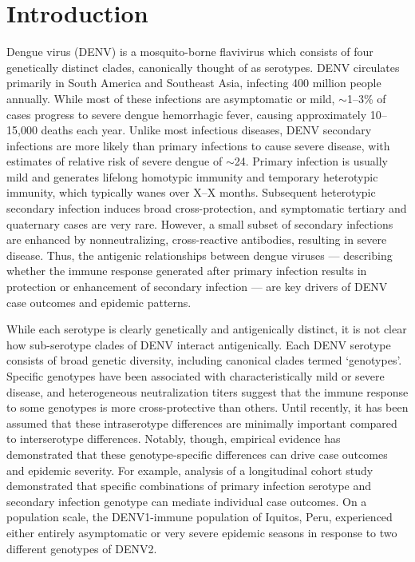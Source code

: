 \documentclass[11pt,oneside,letterpaper]{article}
\begin{document}
\section*{Introduction}
Dengue virus (DENV) is a mosquito-borne flavivirus which consists of four genetically distinct clades, canonically thought of as serotypes.
DENV circulates primarily in South America and Southeast Asia, infecting 400 million people annually.
While most of these infections are asymptomatic or mild, $\sim$1--3\% of cases progress to severe dengue hemorrhagic fever, causing approximately 10--15,000 deaths each year.
Unlike most infectious diseases, DENV secondary infections are more likely than primary infections to cause severe disease, with estimates of relative risk of severe dengue of $\sim$24.
Primary infection is usually mild and generates lifelong homotypic immunity and temporary heterotypic immunity, which typically wanes over X--X months.
Subsequent heterotypic secondary infection induces broad cross-protection, and symptomatic tertiary and quaternary cases are very rare.
However, a small subset of secondary infections are enhanced by nonneutralizing, cross-reactive antibodies, resulting in severe disease.
Thus, the antigenic relationships between dengue viruses --- describing whether the immune response generated after primary infection results in protection or enhancement of secondary infection --- are key drivers of DENV case outcomes and epidemic patterns.

While each serotype is clearly genetically and antigenically distinct, it is not clear how sub-serotype clades of DENV interact antigenically.
Each DENV serotype consists of broad genetic diversity, including canonical clades termed `genotypes'.
Specific genotypes have been associated with characteristically mild or severe disease, and heterogeneous neutralization titers suggest that the immune response to some genotypes is more cross-protective than others.
Until recently, it has been assumed that these intraserotype differences are minimally important compared to interserotype differences.
Notably, though, empirical evidence has demonstrated that these genotype-specific differences can drive case outcomes and epidemic severity.
For example, analysis of a longitudinal cohort study demonstrated that specific combinations of primary infection serotype and secondary infection genotype can mediate individual case outcomes.
On a population scale, the DENV1-immune population of Iquitos, Peru, experienced either entirely asymptomatic or very severe epidemic seasons in response to two different genotypes of DENV2.
\end{document}
